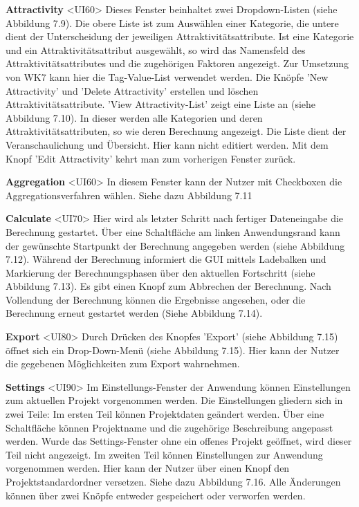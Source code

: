 \documentclass[parskip=full]{scrartcl} %
\begin{document}
\newpage

\textbf{Attractivity }<UI60>
Dieses Fenster beinhaltet zwei Dropdown-Listen (siehe Abbildung 7.9). Die obere Liste ist zum Auswählen einer Kategorie, die untere dient der Unterscheidung der jeweiligen 
Attraktivitätsattribute.
Ist eine Kategorie und ein Attraktivitätsattribut ausgewählt, so wird das Namensfeld des Attraktivitätsattributes und die zugehörigen Faktoren angezeigt. Zur Umsetzung von WK7 kann hier die Tag-Value-List verwendet werden.
Die Knöpfe 'New Attractivity' und 'Delete Attractivity' erstellen und löschen Attraktivitätsattribute. 'View Attractivity-List' zeigt eine Liste an (siehe Abbildung 7.10). In dieser werden alle Kategorien und deren Attraktivitätsattributen, so wie deren Berechnung angezeigt.
Die Liste dient der Veranschaulichung und Übersicht. Hier kann nicht editiert werden.
Mit dem Knopf 'Edit Attractivity' kehrt man zum vorherigen Fenster zurück.

\textbf{Aggregation }<UI60>
In diesem Fenster kann der Nutzer mit Checkboxen die Aggregationsverfahren wählen. Siehe dazu Abbildung 7.11

\textbf{Calculate }<UI70>
Hier wird als letzter Schritt nach fertiger Dateneingabe die Berechnung gestartet. Über eine Schaltfläche am linken Anwendungsrand kann der gewünschte Startpunkt der Berechnung angegeben werden (siehe Abbildung 7.12). Während der Berechnung informiert die GUI mittels Ladebalken und Markierung der Berechnungsphasen über den aktuellen Fortschritt (siehe Abbildung 7.13). Es gibt einen Knopf zum Abbrechen der Berechnung. Nach Vollendung der Berechnung können die Ergebnisse angesehen, oder die Berechnung erneut gestartet werden (Siehe Abbildung 7.14).

\textbf{Export }<UI80>
Durch Drücken des Knopfes 'Export' (siehe Abbildung 7.15) öffnet sich ein Drop-Down-Menü (siehe Abbildung 7.15). Hier kann der Nutzer die gegebenen Möglichkeiten zum Export wahrnehmen.

\textbf{Settings }<UI90>
Im Einstellungs-Fenster der Anwendung können Einstellungen zum aktuellen Projekt vorgenommen werden.
Die Einstellungen gliedern sich in zwei Teile:
Im ersten Teil können Projektdaten geändert werden. Über eine Schaltfläche können Projektname und die zugehörige Beschreibung angepasst werden. Wurde das Settings-Fenster ohne ein offenes Projekt geöffnet, wird dieser Teil nicht angezeigt.
Im zweiten Teil können Einstellungen zur Anwendung vorgenommen werden. Hier kann der Nutzer über einen Knopf den Projektstandardordner versetzen. Siehe dazu Abbildung 7.16.
Alle Änderungen können über zwei Knöpfe entweder gespeichert oder verworfen werden.
\end{document}
